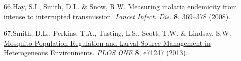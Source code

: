 \documentclass[
]{book}
\newlength{\cslhangindent}
\newlength{\cslentryspacingunit} %
\newenvironment{CSLReferences}[2] %
 {%
  \setlength{\parindent}{0pt}
  \ifodd #1
  \let\oldpar\par
  \def\par{\hangindent=\cslhangindent\oldpar}
  \fi
  \setlength{\parskip}{#2\cslentryspacingunit}
 }%
 {}
\begin{document}
\begin{CSLReferences}{0}{0}
\leavevmode{}%
66.Hay, S.I., Smith, D.L. \& Snow, R.W. \href{https://doi.org/10.1016/S1473-3099(08)70069-0}{Measuring malaria endemicity from intense to interrupted transmission}. \emph{Lancet Infect. Dis.} \textbf{8}, 369--378 (2008).

\leavevmode{}%
67.Smith, D.L., Perkins, T.A., Tusting, L.S., Scott, T.W. \& Lindsay, S.W. \href{https://doi.org/10.1371/journal.pone.0071247}{Mosquito {Population} {Regulation} and {Larval} {Source} {Management} in {Heterogeneous} {Environments}}. \emph{PLOS ONE} \textbf{8}, e71247 (2013).

\end{CSLReferences}
\end{document}

